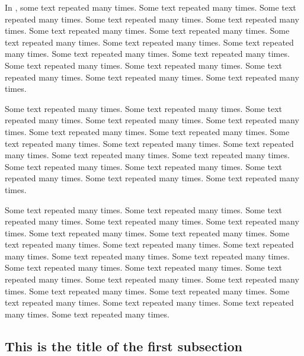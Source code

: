 

In \cite{Dummy}, some text repeated many times. Some text repeated many times. Some text repeated many times. Some text repeated many times. Some text repeated many times. Some text repeated many times. Some text repeated many times. Some text repeated many times. Some text repeated many times. Some text repeated many times. Some text repeated many times. Some text repeated many times. Some text repeated many times. Some text repeated many times. Some text repeated many times. Some text repeated many times. Some text repeated many times. 


Some text repeated many times. Some text repeated many times. Some text repeated many times. Some text repeated many times. Some text repeated many times. Some text repeated many times. Some text repeated many times. Some text repeated many times. Some text repeated many times. Some text repeated many times. Some text repeated many times. Some text repeated many times. Some text repeated many times. Some text repeated many times. Some text repeated many times. Some text repeated many times. Some text repeated many times. 

Some text repeated many times. Some text repeated many times. Some text repeated many times. Some text repeated many times. Some text repeated many times. Some text repeated many times. Some text repeated many times. Some text repeated many times. Some text repeated many times. Some text repeated many times. Some text repeated many times. Some text repeated many times. Some text repeated many times. Some text repeated many times. Some text repeated many times. Some text repeated many times. Some text repeated many times. Some text repeated many times. Some text repeated many times. Some text repeated many times. Some text repeated many times. Some text repeated many times. Some text repeated many times.

\subsection{This is the title of the first subsection}
\label{s:subsection111}

